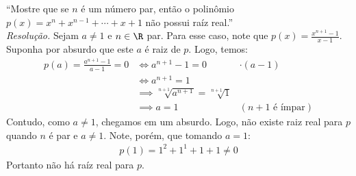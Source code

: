 \enquote{Mostre que se $n$ é um número par, então o polinômio $p(x) = x^n + x^{n - 1} + \cdots + x + 1$ não possui raíz real.} \\ 
\emph{Resolução.} Sejam $a \ne 1$ e $n \in \R$ par. Para esse caso, note que $p(x) = \frac{x^{n+1} - 1}{x - 1}$. Suponha por absurdo que este $a$ é raiz de $p$. Logo, temos:
\begin{align*}
    p(a) = \frac{a^{n+1} - 1}{a - 1} = 0 & \iff
    a^{n+1} - 1 = 0 \quad &\cdot(a - 1) \\ & \iff
    a^{n+1} = 1 \\ & \implies
    \sqrt[n+1]{a^{n+1}} = \sqrt[n+1]{1} \\ & \implies
    a = 1 \quad &(\text{$n+1$ é ímpar})
\end{align*}
Contudo, como $a \ne 1$, chegamos em um absurdo. Logo, não existe raiz real para $p$ quando $n$ é par e $a \ne 1$. Note, porém, que tomando $a = 1$:
\begin{align*}
    p(1) = 1^2 + 1^1 + 1 + 1 \ne 0
\end{align*}
Portanto não há raíz real para $p$.